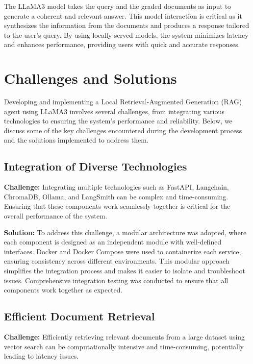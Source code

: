 The LLaMA3 model takes the query and the graded documents as input to generate a coherent and relevant answer. This model interaction is critical as it synthesizes the information from the documents and produces a response tailored to the user's query. By using locally served models, the system minimizes latency and enhances performance, providing users with quick and accurate responses.

\section{Challenges and Solutions}

Developing and implementing a Local Retrieval-Augmented Generation (RAG) agent using LLaMA3 involves several challenges, from integrating various technologies to ensuring the system's performance and reliability. Below, we discuss some of the key challenges encountered during the development process and the solutions implemented to address them.

\subsection{Integration of Diverse Technologies}

\textbf{Challenge:} Integrating multiple technologies such as FastAPI, Langchain, ChromaDB, Ollama, and LangSmith can be complex and time-consuming. Ensuring that these components work seamlessly together is critical for the overall performance of the system.

\textbf{Solution:} To address this challenge, a modular architecture was adopted, where each component is designed as an independent module with well-defined interfaces. Docker and Docker Compose were used to containerize each service, ensuring consistency across different environments. This modular approach simplifies the integration process and makes it easier to isolate and troubleshoot issues. Comprehensive integration testing was conducted to ensure that all components work together as expected.

\subsection{Efficient Document Retrieval}

\textbf{Challenge:} Efficiently retrieving relevant documents from a large dataset using vector search can be computationally intensive and time-consuming, potentially leading to latency issues.

